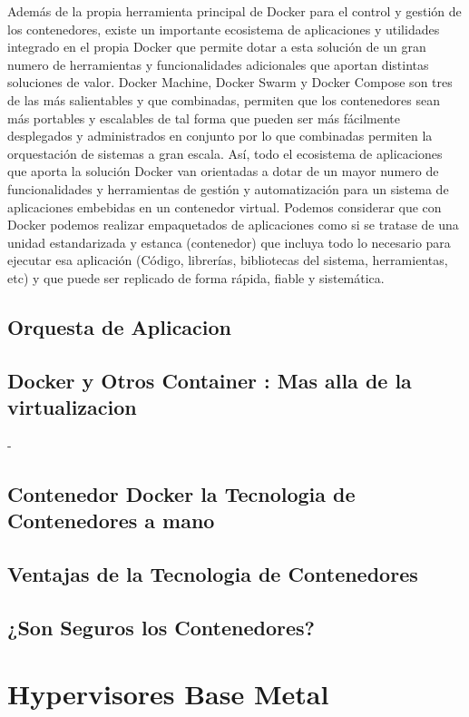 \documentclass[%
 reprint,
 amsmath,amssymb,
 aps,
]{revtex4-1}
\begin{document}
Además de la propia herramienta principal de Docker para el control y gestión de los
contenedores, existe un importante ecosistema de aplicaciones y utilidades integrado en el propia
Docker que permite dotar a esta solución de un gran numero de herramientas y funcionalidades
adicionales que aportan distintas soluciones de valor. Docker Machine, Docker Swarm y Docker
Compose son tres de las más salientables y que combinadas, permiten que los contenedores
sean más portables y escalables de tal forma que pueden ser más fácilmente desplegados y
administrados en conjunto por lo que combinadas permiten la orquestación de sistemas a gran
escala. Así, todo el ecosistema de aplicaciones que aporta la solución Docker van orientadas a
dotar de un mayor numero de funcionalidades y herramientas de gestión y automatización para un
sistema de aplicaciones embebidas en un contenedor virtual.
Podemos considerar que con Docker podemos realizar empaquetados de aplicaciones como si se
tratase de una unidad estandarizada y estanca (contenedor) que incluya todo lo necesario para
ejecutar esa aplicación (Código, librerías, bibliotecas del sistema, herramientas, etc) y que puede
ser replicado de forma rápida, fiable y sistemática.

\subsection{Orquesta de Aplicacion}

\subsection{Docker y Otros Container : Mas alla de la virtualizacion}
- 
\subsection{Contenedor Docker la Tecnologia de Contenedores a mano}
\subsection{Ventajas de la Tecnologia de Contenedores}
\subsection{¿Son Seguros los Contenedores?}

\section {Hypervisores Base Metal}\label{sec:7}
\end{document}
